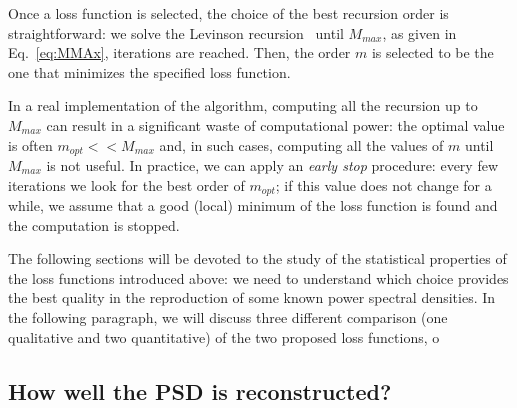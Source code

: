 \documentclass{aa}
\begin{document}
Once a loss function is selected, the choice of the best recursion order is straightforward: we solve the Levinson recursion~\citep{doi:10.1002/sapm1946251261} until $M_{max}$, as given in Eq.~\eqref{eq:MMAx}, iterations are reached. Then, the order $m$ is selected to be the one that minimizes the specified loss function.

In a real implementation of the algorithm, computing all the recursion up to $M_{max}$ can result in a significant waste of computational power: the optimal value is often $m_{opt} << M_{max}$ and, in such cases, computing all the values of $m$ until $M_{max}$ is not useful.
In practice, we can apply an \textit{early stop} procedure: every few iterations we look for the best order of $m_{opt}$; if this value does not change for a while, we assume that a good (local) minimum of the loss function is found and the computation is stopped.

The following sections will be devoted to the study of the statistical properties of the loss functions introduced above: we need to understand which choice provides the best quality in the reproduction of some known power spectral densities. In the following paragraph, we will discuss three different comparison (one qualitative and two quantitative) of the two proposed loss functions, o 
\subsection{How well the PSD is reconstructed?}\label{sec:psd_validation}
\end{document}
